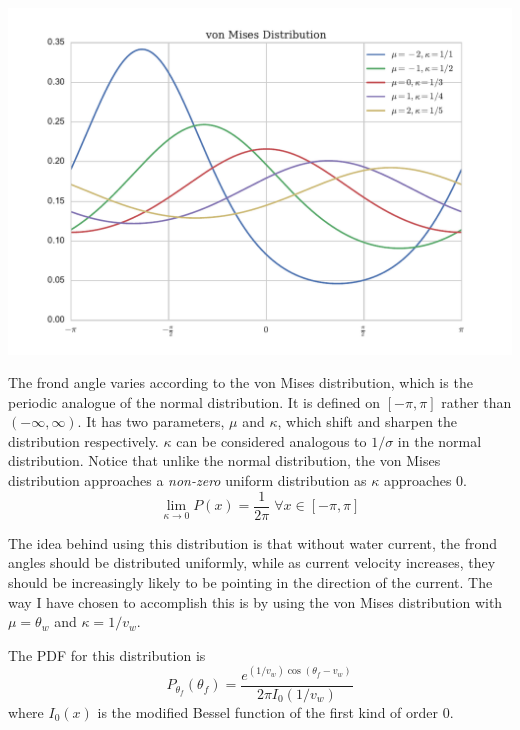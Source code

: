 \documentclass{article}
\newenvironment{mcfig}
	{\par\medskip\noindent\minipage{\linewidth}}
	{\endminipage\par\medskip}
\begin{document}
\begin{multicols}{2}
\begin{mcfig}
	\centering
	\includegraphics[width=\linewidth]{vonmises_2}
	\label{fig:vonmises}
\end{mcfig}

The frond angle varies according to the von Mises distribution, which is the periodic analogue of the normal distribution.
It is defined on $[-\pi,\pi]$ rather than $(-\infty,\infty)$.
It has two parameters, $\mu$ and $\kappa$, which shift and sharpen the distribution respectively.
$\kappa$ can be considered analogous to $1/\sigma$ in the normal distribution.
Notice that unlike the normal distribution, the von Mises distribution approaches a \textit{non-zero} uniform distribution as $\kappa$ approaches 0.
\begin{equation}
	\displaystyle \lim_{\kappa \to 0}P(x) = \frac{1}{2\pi} \;\forall x \in [-\pi,\pi]
\end{equation}

The idea behind using this distribution is that without water current, the frond angles should be distributed uniformly, while as current velocity increases, they should be increasingly likely to be pointing in the direction of the current.
The way I have chosen to accomplish this is by using the von Mises distribution with $\mu = \theta_w$ and $\kappa = 1/v_w$.

The PDF for this distribution is
\begin{equation}
	P_{\theta_f}(\theta_f) = \frac{e^{(1/v_w)\cos(\theta_f-v_w)}}{2\pi I_0(1/v_w)}
\end{equation}
where $I_0(x)$ is the modified Bessel function of the first kind of order 0.


\end{multicols}
\end{document}
